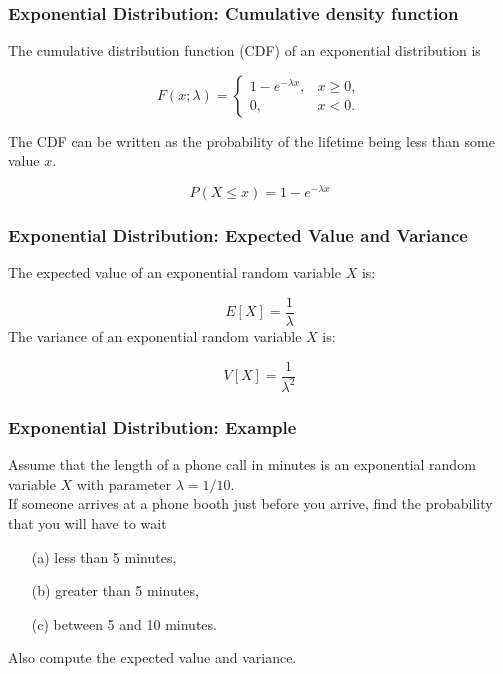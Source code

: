 \documentclass{beamer}
\begin{document}
\begin{frame}[fragile]
\frametitle{Exponential Distribution: Cumulative density function}
\Large
\vspace{-1cm}
The cumulative distribution function (CDF) of an exponential distribution is

\[
F(x;\lambda) = \begin{cases}
1-e^{-\lambda x}, & x \ge 0, \\
0, & x < 0.
\end{cases}\]

The CDF can be written as the probability of the lifetime being less than some value $x$.

\[ P(X \leq x) = 1-e^{-\lambda x} \]

\end{frame}

\begin{frame}[fragile]
\frametitle{Exponential Distribution: Expected Value and Variance}
\Large
\vspace{-1.2cm}
The expected value of an exponential random variable $X$ is:

\[
E[X] = \frac{1}{\lambda}\]
The variance of an exponential random variable $X$ is:

\[
V[X] = \frac{1}{\lambda^2}\]

\end{frame}

\begin{frame}[fragile]
\frametitle{Exponential Distribution: Example}
\Large
\vspace{-1.2cm}
Assume that the length of a phone call in minutes is an exponential random variable $X$ with parameter
$\lambda = 1/10$. \\ 
\vspace{0.5cm}
If someone arrives at a phone booth just before you arrive, find the probability that you
will have to wait \begin{itemize}
\item[(a)] less than 5 minutes,
\item[(b)] greater than 5 minutes,
\item[(c)] between 5 and 10 minutes.
\end{itemize}
Also compute the expected value and variance.
\end{frame}
\end{document}
